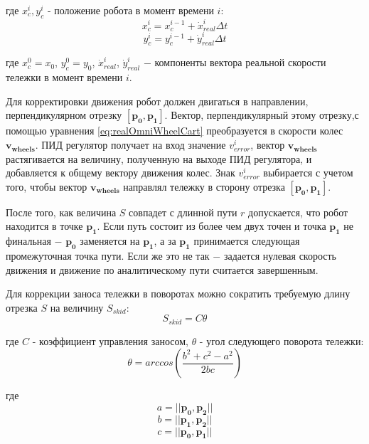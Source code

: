 \documentclass[oneside,final,14pt]{extreport}
\newcommand{\bs}{\boldsymbol}
\begin{document}
где $x_c^i, y_c^i$ - положение робота в момент времени $i$:
\begin{equation}
x_c^i =
x_c^{i-1}
+
\dot{x}_{real}^{i}
\Delta t 
\end{equation} 
\begin{equation}
y_c^i =
y_c^{i-1}
+
\dot{y}_{real}^{i}
\Delta t 
\end{equation} 

где $x_c^0 = x_0$, $y_c^0 = y_0$, $\dot{x}_{real}^{i}$, $\dot{y}_{real}^{i}$  $-$ компоненты вектора реальной скорости тележки в момент времени $i$. 

Для корректировки движения робот должен двигаться в направлении, перпендикулярном отрезку $[\bs{p_0},\bs{p_1}]$. Вектор, перпендикулярный этому отрезку,с помощью уравнения \ref{eq:realOmniWheelCart} преобразуется в скорости колес $\bs{v_{wheels}}$. ПИД регулятор получает на вход значение $v_{error}^i$, вектор $\bs{v_{wheels}}$ растягивается на величину, полученную на выходе ПИД регулятора, и добавляется к общему вектору движения колес. Знак $v_{error}^i$ выбирается с учетом того, чтобы вектор $\bs{v_{wheels}}$ направлял тележку в сторону отрезка $[\bs{p_0},\bs{p_1}]$.

После того, как величина $S$ совпадет с длинной пути $r$ допускается, что робот находится в точке $\bs{p_1}$.  Если путь состоит из более чем двух точен и точка $\bs{p_1}$ не финальная $-$ $\bs{p_0}$ заменяется на $\bs{p_1}$, а за  $\bs{p_1}$ принимается следующая промежуточная точка пути. Если же это не так $-$ задается нулевая скорость движения и движение по аналитическому пути считается завершенным.

Для коррекции заноса тележки в поворотах можно сократить требуемую длину отрезка $S$ на величину $S_{skid}$:
\begin{equation}
S_{skid}
=
C
\theta
\end{equation}

где $C$ - коэффициент управления заносом, $\theta$ - угол следующего поворота тележки:
\begin{equation}
\theta
=
arccos
(
\frac{b^2 + c^2 - a^2}{2bc}
)
\end{equation}

где 
\begin{equation}
a = ||\bs{p_0},\bs{p_2}||
\end{equation}
\begin{equation}
b = ||\bs{p_1},\bs{p_2}||
\end{equation}
\begin{equation}
c = ||\bs{p_0},\bs{p_1}||
\end{equation}
\end{document}
